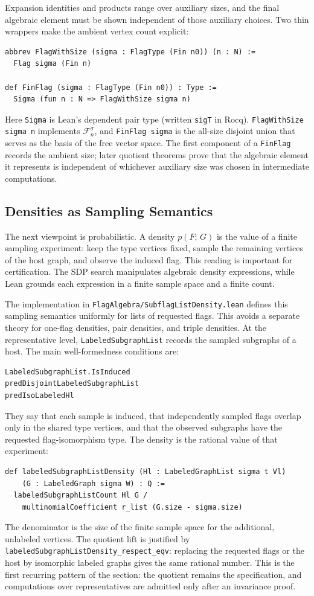 \documentclass{article}
\newcommand{\den}[2]{p(#1;\,#2)}
\newcommand{\lean}[1]{\texttt{#1}}
\begin{document}
Expansion identities and products range over auxiliary sizes, and the final
algebraic element must be shown independent of those auxiliary choices.  Two
thin wrappers make the ambient vertex count explicit:
\begin{lstlisting}
abbrev FlagWithSize (sigma : FlagType (Fin n0)) (n : N) :=
  Flag sigma (Fin n)

def FinFlag (sigma : FlagType (Fin n0)) : Type :=
  Sigma (fun n : N => FlagWithSize sigma n)
\end{lstlisting}
Here \lean{Sigma} is Lean's dependent pair type (written \lean{sigT} in Rocq).
\lean{FlagWithSize sigma n} implements $\mathcal{F}^\sigma_n$, and
\lean{FinFlag sigma} is the all-size disjoint union that serves as the basis
of the free vector space.  The first component of a \lean{FinFlag} records the
ambient size; later quotient theorems prove that the algebraic element it
represents is independent of whichever auxiliary size was chosen in
intermediate computations.

\subsection{Densities as Sampling Semantics}

The next viewpoint is probabilistic.  A density $\den{F}{G}$ is the value of a
finite sampling experiment: keep the type vertices fixed, sample the remaining
vertices of the host graph, and observe the induced flag.  This reading is
important for certification.  The SDP search manipulates algebraic density
expressions, while Lean grounds each expression in a finite sample space and a
finite count.

The implementation in \lean{FlagAlgebra/SubflagListDensity.lean} defines this
sampling semantics uniformly for lists of requested flags.  This avoids a
separate theory for one-flag densities, pair densities, and triple densities.
At the representative level, \lean{LabeledSubgraphList} records the sampled
subgraphs of a host.  The main well-formedness conditions are:
\begin{lstlisting}
LabeledSubgraphList.IsInduced
predDisjointLabeledSubgraphList
predIsoLabeledHl
\end{lstlisting}
They say that each sample is induced, that independently sampled flags overlap
only in the shared type vertices, and that the observed subgraphs have the
requested flag-isomorphism type.  The density is the rational value of that
experiment:
\begin{lstlisting}
def labeledSubgraphListDensity (Hl : LabeledGraphList sigma t Vl)
    (G : LabeledGraph sigma W) : Q :=
  labeledSubgraphListCount Hl G /
    multinomialCoefficient r_list (G.size - sigma.size)
\end{lstlisting}
The denominator is the size of the finite sample space for the additional,
unlabeled vertices.  The quotient lift is justified by
\lean{labeledSubgraphListDensity\_respect\_eqv}: replacing the requested flags
or the host by isomorphic labeled graphs gives the same rational number.  This
is the first recurring pattern of the section: the quotient remains the
specification, and computations over representatives are admitted only after an
invariance proof.
\end{document}
